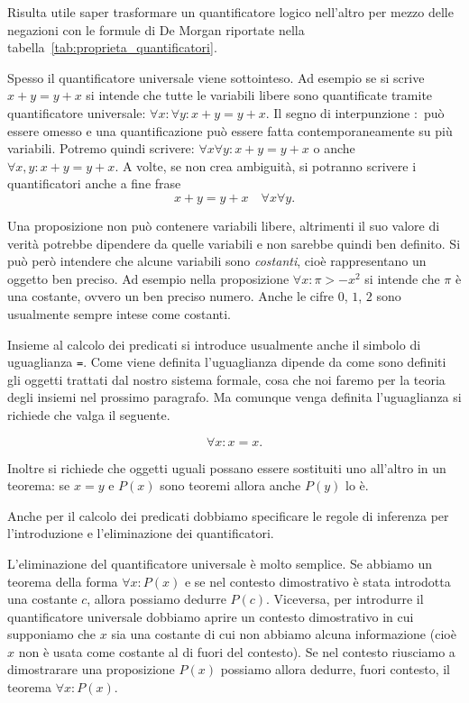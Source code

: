 Risulta utile saper trasformare un quantificatore logico
nell'altro per mezzo delle negazioni con le formule 
di De Morgan riportate
nella tabella~\ref{tab:proprieta_quantificatori}.

Spesso il quantificatore universale viene sottointeso.
Ad esempio se si scrive $x+y=y+x$
si intende che tutte le variabili libere sono quantificate 
tramite quantificatore universale: 
$\forall x\colon \forall y\colon x+y=y+x$.
Il segno di interpunzione $\colon$ può essere omesso
e una quantificazione può essere fatta contemporaneamente 
su più variabili. 
Potremo quindi scrivere: $\forall x\forall y\colon x+y=y+x$ 
o anche $\forall x,y\colon x+y = y+x$.
A volte, se non crea ambiguità, si potranno scrivere 
i quantificatori anche a fine frase 
\[
  x+y=y+x \quad \forall x\forall y.
\]

Una proposizione non può contenere variabili libere, 
altrimenti il suo valore di verità potrebbe dipendere da quelle 
variabili e non sarebbe quindi ben definito.
%
%
Si può però intendere che alcune variabili sono \emph{costanti},
cioè rappresentano un oggetto ben preciso.
Ad esempio nella proposizione $\forall x: \pi > -x^2$ si intende 
che $\pi$ è una costante, ovvero un ben preciso numero.
Anche le cifre $0$, $1$, $2$ sono usualmente sempre intese come
costanti.

Insieme al calcolo dei predicati si introduce usualmente anche il simbolo di uguaglianza \texttt{=}.
Come viene definita l'uguaglianza dipende da come sono definiti gli oggetti trattati 
dal nostro sistema formale, cosa che noi faremo per la teoria degli insiemi nel prossimo paragrafo.
Ma comunque venga definita l'uguaglianza si richiede che valga il seguente.
\begin{axiom}[uguaglianza]
\[
  \forall x\colon x=x.  
\]
\end{axiom}
Inoltre si richiede che oggetti uguali possano essere 
sostituiti uno all'altro in un teorema:
se $x=y$ e $P(x)$ sono teoremi allora anche $P(y)$ lo è.

Anche per il calcolo dei predicati dobbiamo specificare le regole 
di inferenza per l'introduzione e l'eliminazione dei quantificatori.

%
%
L'eliminazione del quantificatore universale è molto semplice. 
Se abbiamo un teorema della forma $\forall x\colon P(x)$
e se nel contesto dimostrativo è stata introdotta una costante 
$c$, allora possiamo dedurre $P(c)$.
%
Viceversa, per introdurre il quantificatore universale 
dobbiamo aprire un contesto dimostrativo in cui supponiamo 
che $x$ sia una costante di cui non abbiamo alcuna informazione 
(cioè $x$ non è usata come costante al di fuori del contesto).
Se nel contesto riusciamo a dimostrarare una proposizione $P(x)$ possiamo 
allora dedurre, fuori contesto, il teorema $\forall x\colon P(x)$.


